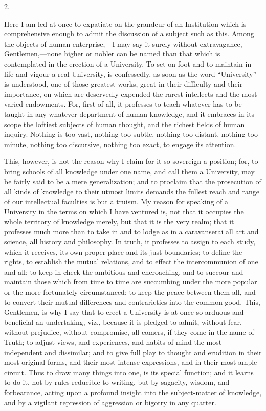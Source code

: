 2.

Here I am led at once to expatiate on the grandeur of an
Institution which is comprehensive enough to admit the discussion of a
subject such as this. Among the objects of human enterprise,—I may
say it surely without extravagance, Gentlemen,—none higher or nobler
can be named than that which is contemplated in the erection of a
University. To set on foot and to maintain in life and vigour a real
University, is confessedly, as soon as the word ``University''
is understood, one of those greatest works, great in their difficulty
and their importance, on which are deservedly expended the rarest
intellects and the most varied endowments. For, first of all, it
professes to teach whatever has to be taught in any whatever
department of human knowledge, and it embraces in its scope the
loftiest subjects of human thought, and the richest fields of human
inquiry. Nothing is too vast, nothing too subtle, nothing too distant,
nothing too minute, nothing too discursive, nothing too exact, to
engage its attention.

This, however, is not the reason why I claim for it so sovereign a
position; for, to bring schools of all knowledge under one name, and
call them a University, may be fairly said to be a mere
generalization; and to proclaim that the prosecution of all kinds of
knowledge to their utmost limits demands the fullest reach and range
of our intellectual faculties is but a truism. My reason for speaking
of a University in the terms on which I have ventured is, not that it
occupies the whole territory of knowledge merely, but that it is the
very realm; that it professes much more than to take in and to lodge
as in a caravanserai all art and science, all history and philosophy.
In truth, it professes to assign to each study, which it receives, its
own proper place and its just boundaries; to define the rights, to
establish the mutual relations, and to effect the intercommunion of
one and all; to keep in check the ambitious and encroaching, and
to succour and maintain those which from time to time are succumbing
under the more popular or the more fortunately circumstanced; to keep
the peace between them all, and to convert their mutual differences
and contrarieties into the common good. This, Gentlemen, is why I say
that to erect a University is at once so arduous and beneficial an
undertaking, viz., because it is pledged to admit, without fear,
without prejudice, without compromise, all comers, if they come in the
name of Truth; to adjust views, and experiences, and habits of mind
the most independent and dissimilar; and to give full play to thought
and erudition in their most original forms, and their most intense
expressions, and in their most ample circuit. Thus to draw many things
into one, is its special function; and it learns to do it, not by
rules reducible to writing, but by sagacity, wisdom, and forbearance,
acting upon a profound insight into the subject-matter of knowledge,
and by a vigilant repression of aggression or bigotry in any quarter.

